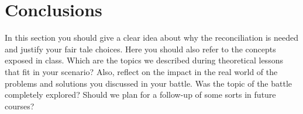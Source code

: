 \section{Conclusions}
In this section you should give a clear idea about why the reconciliation is needed and justify your fair tale choices. Here you should also refer to the concepts exposed in class. Which are the topics we described during theoretical lessons that fit in your scenario? Also, reflect on the impact in the real world of the problems and solutions you discussed in your battle. Was the topic of the battle completely explored? Should we plan for a follow-up of some sorts in future courses?